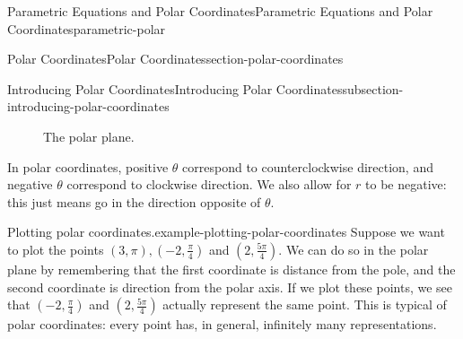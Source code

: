 \documentclass[oneside,10pt,]{book}
\numberwithin{equation}{section}
\begin{document}
\begin{chapterptx}{Parametric Equations and Polar Coordinates}{}{Parametric Equations and Polar Coordinates}{}{}{parametric-polar}
\begin{sectionptx}{Polar Coordinates}{}{Polar Coordinates}{}{}{section-polar-coordinates}
\begin{subsectionptx}{Introducing Polar Coordinates}{}{Introducing Polar Coordinates}{}{}{subsection-introducing-polar-coordinates}
\begin{figure}
{\begin{tikzpicture}[scale=.6]
\end{tikzpicture}
}
\caption{The polar plane.\label{figure-polar-plane}}
\end{figure}
\hypertarget{p-1017}{}%
In polar coordinates, positive \(\theta\) correspond to counterclockwise direction, and negative \(\theta\) correspond to clockwise direction. We also allow for \(r\) to be negative: this just means go in the direction opposite of \(\theta\).%
\begin{example}{Plotting polar coordinates.}{example-plotting-polar-coordinates}%
\hypertarget{p-1018}{}%
Suppose we want to plot the points \((3,\pi), (-2,\frac{\pi}{4})\) and \((2,\frac{5\pi}{4}).\) We can do so in the polar plane by remembering that the first coordinate is distance from the pole, and the second coordinate is direction from the polar axis. If we plot these points, we see that \((-2,\frac{\pi}{4})\) and \((2,\frac{5\pi}{4})\) actually represent the same point. This is typical of polar coordinates: every point has, in general, infinitely many representations.%
\end{example}
\begin{figure}
\centering
{
}
\end{figure}
\end{subsectionptx}
\end{sectionptx}
\end{chapterptx}
\end{document}
